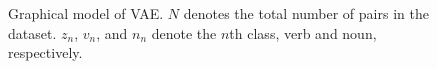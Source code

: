 \documentclass[11pt]{scrartcl}
\begin{document}
\begin{figure}
\centering
{}
\caption{Graphical model of VAE. $N$ denotes the total
number of pairs in the dataset. $z_n$, $v_n$, and $n_n$ denote the
$n$th class, verb and noun, respectively.}
\label{fig:graphmodelvae}
\end{figure}






\end{document}
